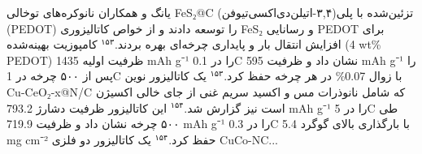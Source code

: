 \documentclass[12pt,a4paper,twocolumn]{article} %
\newcommand{\persian}[1]{\textfarsi{#1}}
\newcommand{\english}[1]{\textenglish{#1}}
\begin{document}
\persian{
یانگ و همکاران نانوکره‌های توخالی \english{FeS₂@C} تزئین‌شده با پلی(۳,۴-اتیلن‌دی‌اکسی‌تیوفن) (\english{PEDOT}) را توسعه دادند و از خواص کاتالیزوری \english{FeS₂} و رسانایی \english{PEDOT} برای افزایش انتقال بار و پایداری چرخه‌ای بهره بردند.$^{۱۵۳}$ کامپوزیت بهینه‌شده (\english{4 wt\% PEDOT}) ظرفیت اولیه \english{1435 mAh g⁻¹} را در \english{0.1C} نشان داد و ظرفیت \english{595 mAh g⁻¹} را پس از ۵۰۰ چرخه در \english{1C} با زوال \english{0.07\%} در هر چرخه حفظ کرد.$^{۱۵۳}$ یک کاتالیزور نوین \english{Cu-CeO₂-x@N/C} که شامل نانوذرات مس و اکسید سریم غنی از جای خالی اکسیژن است نیز گزارش شد.$^{۱۵۴}$ این کاتالیزور ظرفیت دشارژ \english{793.2 mAh g⁻¹} را در \english{5C} طی ۵۰۰ چرخه نشان داد و ظرفیت \english{719.9 mAh g⁻¹} را در \english{0.3C} با بارگذاری بالای گوگرد \english{5.4 mg cm⁻²} حفظ کرد.$^{۱۵۴}$ یک کاتالیزور دو فلزی \english{CuCo-NC}...
}
\end{document}

